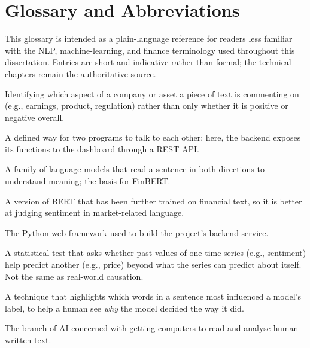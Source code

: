 \chapter*{Glossary and Abbreviations}

This glossary is intended as a plain-language reference for readers less familiar with the NLP, machine-learning, and finance terminology used throughout this dissertation. Entries are short and indicative rather than formal; the technical chapters remain the authoritative source.

\begin{description}
\setlength{\itemsep}{0.25em}

\item[ABSA (Aspect-Based Sentiment Analysis)] Identifying which aspect of a company or asset a piece of text is commenting on (e.g., earnings, product, regulation) rather than only whether it is positive or negative overall.

\item[API (Application Programming Interface)] A defined way for two programs to talk to each other; here, the backend exposes its functions to the dashboard through a REST API.

\item[BERT] A family of language models that read a sentence in both directions to understand meaning; the basis for FinBERT.

\item[FinBERT] A version of BERT that has been further trained on financial text, so it is better at judging sentiment in market-related language.

\item[FastAPI] The Python web framework used to build the project's backend service.

\item[Granger causality] A statistical test that asks whether past values of one time series (e.g., sentiment) help predict another (e.g., price) beyond what the series can predict about itself. Not the same as real-world causation.

\item[LIME (Local Interpretable Model-agnostic Explanations)] A technique that highlights which words in a sentence most influenced a model's label, to help a human see \emph{why} the model decided the way it did.

\item[NLP (Natural Language Processing)] The branch of AI concerned with getting computers to read and analyse human-written text.


\end{description}
